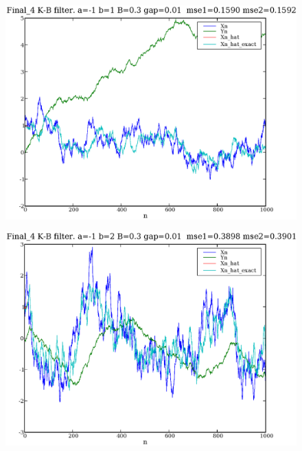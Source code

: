 \documentclass[a4paper,10pt]{article}
\begin{document}
\begin{figure}
\includegraphics[width=1\textwidth]{Final_4_Xn_Yn_Xn_hat_a_-1_b_1_B_0.3_gap_0.01.eps}
\caption{}\label{f12}
\end{figure}

\begin{figure}
\includegraphics[width=1\textwidth]{Final_4_Xn_Yn_Xn_hat_a_-1_b_2_B_0.3_gap_0.01.eps}
\caption{}\label{f13}
\end{figure}
\end{document}
